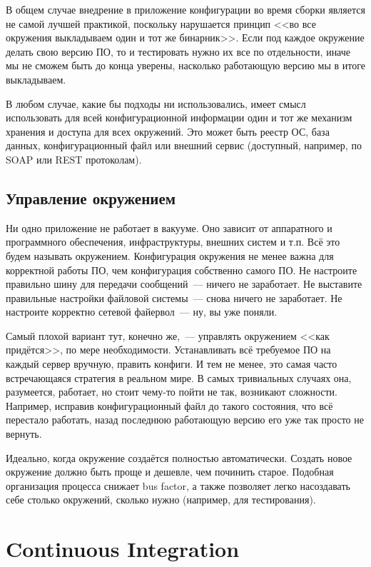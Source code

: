 \documentclass{../../text-style}
\begin{document}
В общем случае внедрение в приложение конфигурации во время сборки является не самой лучшей практикой, поскольку нарушается принцип <<во все окружения выкладываем один и тот же бинарник>>. Если под каждое окружение делать свою версию ПО, то и тестировать нужно их все по отдельности, иначе мы не сможем быть до конца уверены, насколько работающую версию мы в итоге выкладываем.

В любом случае, какие бы подходы ни использовались, имеет смысл использовать для всей конфигурационной информации один и тот же механизм хранения и доступа для всех окружений. Это может быть реестр ОС, база данных, конфигурационный файл или внешний сервис (доступный, например, по SOAP или REST протоколам).

\subsection{Управление окружением}

Ни одно приложение не работает в вакууме. Оно зависит от аппаратного и программного обеспечения, инфраструктуры, внешних систем и т.п. Всё это будем называть окружением. Конфигурация окружения не менее важна для корректной работы ПО, чем конфигурация собственно самого ПО. Не настроите правильно шину для передачи сообщений~--- ничего не заработает. Не выставите правильные настройки файловой системы~--- снова ничего не заработает. Не настроите корректно сетевой файервол~--- ну, вы уже поняли.

Самый плохой вариант тут, конечно же,~--- управлять окружением <<как придётся>>, по мере необходимости. Устанавливать всё требуемое ПО на каждый сервер вручную, править конфиги. И тем не менее, это самая часто встречающаяся стратегия в реальном мире. В самых тривиальных случаях она, разумеется, работает, но стоит чему-то пойти не так, возникают сложности. Например, исправив конфигурационный файл до такого состояния, что всё перестало работать, назад последнюю работающую версию его уже так просто не вернуть.

Идеально, когда окружение создаётся полностью автоматически. Создать новое окружение должно быть проще и дешевле, чем починить старое. Подобная организация процесса снижает bus factor, а также позволяет легко насоздавать себе столько окружений, сколько нужно (например, для тестирования).

\section{Continuous Integration}
\end{document}

